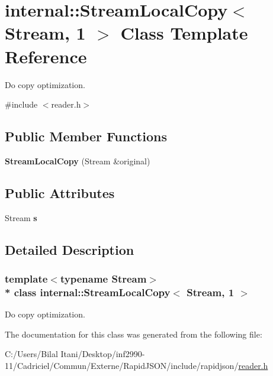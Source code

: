 \hypertarget{classinternal_1_1_stream_local_copy_3_01_stream_00_011_01_4}{}\section{internal\+:\+:Stream\+Local\+Copy$<$ Stream, 1 $>$ Class Template Reference}
\label{classinternal_1_1_stream_local_copy_3_01_stream_00_011_01_4}


Do copy optimization.  




{\ttfamily \#include $<$reader.\+h$>$}

\subsection*{Public Member Functions}
\begin{DoxyCompactItemize}
\item 
{\bfseries Stream\+Local\+Copy} (Stream \&original)\hypertarget{classinternal_1_1_stream_local_copy_3_01_stream_00_011_01_4_aba475fed3eecc9f77ff059fdb7fe2a32}{}\label{classinternal_1_1_stream_local_copy_3_01_stream_00_011_01_4_aba475fed3eecc9f77ff059fdb7fe2a32}

\end{DoxyCompactItemize}
\subsection*{Public Attributes}
\begin{DoxyCompactItemize}
\item 
Stream {\bfseries s}\hypertarget{classinternal_1_1_stream_local_copy_3_01_stream_00_011_01_4_a1d3e8ae8756325df25715d4ffb9c1b44}{}\label{classinternal_1_1_stream_local_copy_3_01_stream_00_011_01_4_a1d3e8ae8756325df25715d4ffb9c1b44}

\end{DoxyCompactItemize}


\subsection{Detailed Description}
\subsubsection*{template$<$typename Stream$>$\\*
class internal\+::\+Stream\+Local\+Copy$<$ Stream, 1 $>$}

Do copy optimization. 

The documentation for this class was generated from the following file\+:\begin{DoxyCompactItemize}
\item 
C\+:/\+Users/\+Bilal Itani/\+Desktop/inf2990-\/11/\+Cadriciel/\+Commun/\+Externe/\+Rapid\+J\+S\+O\+N/include/rapidjson/\hyperlink{reader_8h}{reader.\+h}\end{DoxyCompactItemize}

